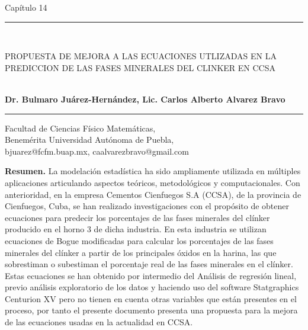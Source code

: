 \documentclass[spanish]{report}
\begin{document}
\setcounter{page}{197}







\begin{flushright}

{\Huge Cap\'itulo 14}
\end{flushright}

\rule{123mm}{.4mm}
\\


\begin{center}
    PROPUESTA DE MEJORA A LAS ECUACIONES UTLIZADAS EN LA PREDICCION DE LAS FASES MINERALES DEL CLINKER EN CCSA
\end{center}
\vspace{.5cm}
\\

\textbf{Dr. Bulmaro Juárez-Hernández,  Lic. Carlos Alberto Alvarez Bravo}\\

\rule{123mm}{.4mm}
\begin{center}



Facultad de Ciencias F\'isico Matem\'aticas,\\
Benem\'erita Universidad Aut\'onoma de Puebla,\\
bjuarez@fcfm.buap.mx, caalvarezbravo@gmail.com
\end{center}



\textbf{Resumen. }
La modelación estadística ha sido ampliamente utilizada en múltiples aplicaciones articulando aspectos teóricos, metodológicos y computacionales. Con anterioridad, en la empresa Cementos Cienfuegos S.A (CCSA), de la provincia de Cienfuegos, Cuba, se han realizado investigaciones con el propósito de obtener ecuaciones para predecir los porcentajes de las fases minerales del clínker producido en el horno 3 de dicha industria. En esta industria se utilizan ecuaciones de Bogue modificadas para calcular los porcentajes de las fases minerales del clínker a partir de los principales óxidos en la harina, las que sobrestiman o subestiman el porcentaje real de las fases minerales en el clínker. Estas ecuaciones se han obtenido por intermedio del Análisis de regresión lineal, previo análisis exploratorio de los datos y haciendo uso del software Statgraphics Centurion XV pero no tienen en cuenta otras variables que están presentes en el proceso, por tanto el presente documento presenta una propuesta para la mejora de las ecuaciones usadas en la actualidad en CCSA.
\vspace{.5cm}
\\
\end{document}
